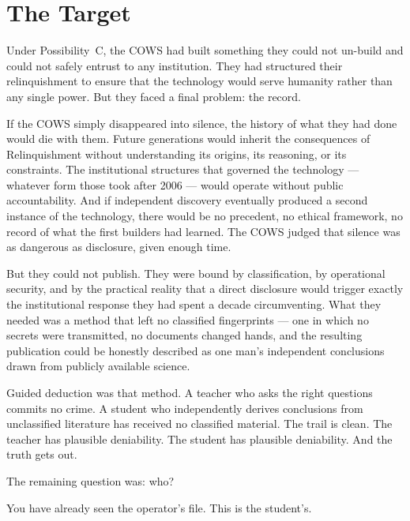 

\chapter*{The Target}
\label{record:target}

Under Possibility~C, the COWS had built something they could not un-build and could not safely entrust to any institution. They had structured their relinquishment to ensure that the technology would serve humanity rather than any single power. But they faced a final problem: the record.

If the COWS simply disappeared into silence, the history of what they had done would die with them. Future generations would inherit the consequences of Relinquishment without understanding its origins, its reasoning, or its constraints. The institutional structures that governed the technology --- whatever form those took after 2006 --- would operate without public accountability. And if independent discovery eventually produced a second instance of the technology, there would be no precedent, no ethical framework, no record of what the first builders had learned. The COWS judged that silence was as dangerous as disclosure, given enough time.

But they could not publish. They were bound by classification, by operational security, and by the practical reality that a direct disclosure would trigger exactly the institutional response they had spent a decade circumventing. What they needed was a method that left no classified fingerprints --- one in which no secrets were transmitted, no documents changed hands, and the resulting publication could be honestly described as one man's independent conclusions drawn from publicly available science.

Guided deduction was that method. A teacher who asks the right questions commits no crime. A student who independently derives conclusions from unclassified literature has received no classified material. The trail is clean. The teacher has plausible deniability. The student has plausible deniability. And the truth gets out.

The remaining question was: who?

You have already seen the operator's file. This is the student's.

